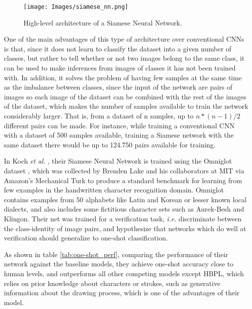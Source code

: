 \begin{figure*}[htbp]
        \centering            
        \texttt{[image: Images/siamese\_nn.png]}
        \caption[High-level architecture of a Siamese Neural Network.]
        {\small High-level architecture of a Siamese Neural Network.} 
        \label{fig:siamese}
    \end{figure*}

One of the main advantages of this type of architecture over conventional CNNs is that, since it does not learn to classify the dataset into a given number of classes, but rather to tell whether or not two images belong to the same class, it can be used to make inferences from images of classes it has not been trained with. In addition, it solves the problem of having few samples at the same time as the imbalance between classes, since the input of the network are pairs of images so each image of the dataset can be combined with the rest of the images of the dataset, which makes the number of samples available to train the network considerably larger. That is, from a dataset of n samples, up to $n*(n-1)/2$ different pairs can be made. For instance, while training a conventional CNN with a dataset of 500 samples available, training a Siamese network with the same dataset there would be up to 124.750 pairs available for training.

In Koch \emph{et al.} \cite{koch2015siamese}, their Siamese Neural Network is trained using the Omniglot dataset \cite{lake2015human}, which was collected by Brenden Lake and his collaborators at MIT via Amazon’s Mechanical Turk to produce a standard benchmark for learning from few examples in the handwritten character recognition domain. Omniglot contains examples from 50 alphabets like Latin and Korean or lesser known local dialects, and also includes some fictitious character sets such as Aurek-Besh and Klingon. Their net was trained for a verification task, \emph{i.e.} discriminate
between the class-identity of image pairs, and hypothesize that networks which do well at verification should generalize to one-shot classification.

As shown in table \ref{tab:one-shot_perf}, comparing the performance of their network against the baseline models, they achieve one-shot accuracy close to human levels, and outperforms all other competing models except HBPL, which relies on prior knowledge about characters or strokes, such as generative information about the drawing process, which is one of the advantages of their model.

